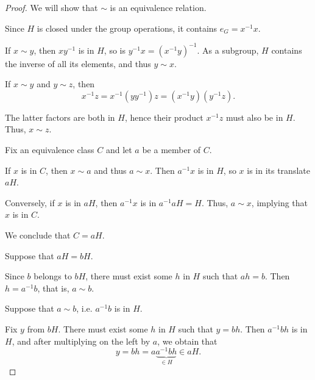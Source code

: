\begin{proof}
   We will show that \( {\sim} \) is an equivalence relation.

   Since \( H \) is closed under the group operations, it contains \( e_G = x^{-1} x \).

   If \( x \sim y \), then \( xy^{-1} \) is in \( H \), so is \( y^{-1} x = (x^{-1} y)^{-1} \). As a subgroup, \( H \) contains the inverse of all its elements, and thus \( y \sim x \).

   If \( x \sim y \) and \( y \sim z \), then
  \begin{equation*}
    x^{-1} z
    =
    x^{-1} (y y^{-1}) z
    =
    (x^{-1} y) (y^{-1} z).
  \end{equation*}

  The latter factors are both in \( H \), hence their product \( x^{-1} z \) must also be in \( H \). Thus, \( x \sim z \).

   Fix an equivalence class \( C \) and let \( a \) be a member of \( C \).

  If \( x \) is in \( C \), then \( x \sim a \) and thus \( a \sim x \). Then \( a^{-1} x \) is in \( H \), so \( x \) is in its translate \( aH \).

  Conversely, if \( x \) is in \( a H \), then \( a^{-1} x \) is in \( a^{-1} a H = H \). Thus, \( a \sim x \), implying that \( x \) is in \( C \).

  We conclude that \( C = a H \).


  \SufficiencySubProof* Suppose that \( a H = b H \).

  Since \( b \) belongs to \( b H \), there must exist some \( h \) in \( H \) such that \( a h = b \). Then \( h = a^{-1} b \), that is, \( a \sim b \).

  \NecessitySubProof* Suppose that \( a \sim b \), i.e. \( a^{-1} b \) is in \( H \).

  Fix \( y \) from \( b H \). There must exist some \( h \) in \( H \) such that \( y = bh \). Then \( a^{-1} b h \) is in \( H \), and after multiplying on the left by \( a \), we obtain that
  \begin{equation*}
    y = bh = a \underbrace{a^{-1} b h}_{\in H} \in a H.
  \end{equation*}


\end{proof}
